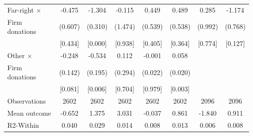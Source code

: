 \documentclass[12pt,a4paper]{article}
\begin{document}
\begin{landscape}
\begin{table}[!htbp]
{\begin{tabular}{l*{7}{c}}
Far-right $\times$
                & -0.475 & -1.304 & -0.115 & 0.449 & 0.489 & 0.285 & -1.174 \\
Firm donations
                & (0.607) & (0.310) & (1.474) & (0.539) & (0.538) & (0.992) & (0.768) \\
                & [0.434] & [0.000] & [0.938] & [0.405] & [0.364] & [0.774] & [0.127] \\

Other $\times$
                & -0.248 & -0.534 & 0.112 & -0.001 & 0.058 &   &   \\
Firm donations
                & (0.142) & (0.195) & (0.294) & (0.022) & (0.020) &   &   \\
                & [0.081] & [0.006] & [0.704] & [0.979] & [0.003] &   &   \\

\hline
Observations    & 2602 & 2602 & 2602 & 2602 & 2602 & 2096 & 2096 \\
Mean outcome    & -0.652 & 1.375 & 3.031 & -0.037 & 0.861 & -1.840 & 0.911 \\
R2-Within       & 0.040 & 0.029 & 0.014 & 0.008 & 0.013 & 0.006 & 0.008 \\
\hline\hline
\end{tabular}
}

\end{table}
\end{landscape}
\end{document}
